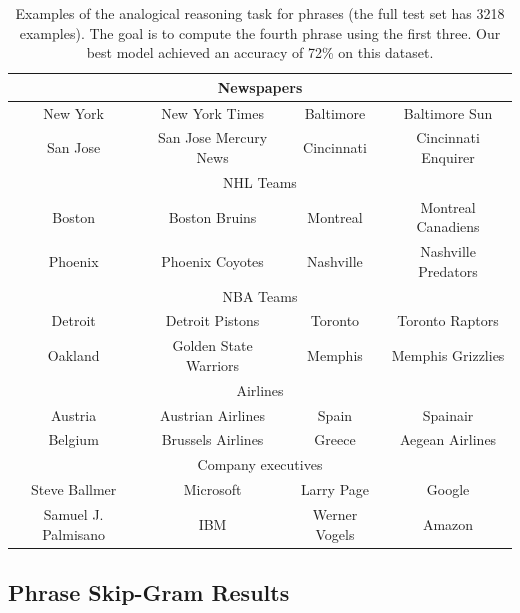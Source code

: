 \documentclass{article}
\begin{document}
\begin{table}
\small
\begin{center}
\begin{tabular}{|c c||c c|}
\hline
\multicolumn{4}{|c|}{Newspapers}\\
\hline
New York & New York Times & Baltimore & Baltimore Sun \\
San Jose & San Jose Mercury News & Cincinnati & Cincinnati Enquirer \\
\hline
\multicolumn{4}{|c|}{NHL Teams}\\
\hline
Boston & Boston Bruins & Montreal & Montreal Canadiens \\
Phoenix & Phoenix Coyotes & Nashville & Nashville Predators \\
\hline
\multicolumn{4}{|c|}{NBA Teams}\\
\hline
Detroit & Detroit Pistons & Toronto & Toronto Raptors \\
Oakland & Golden State Warriors & Memphis & Memphis Grizzlies \\
\hline
\multicolumn{4}{|c|}{Airlines}\\
\hline
Austria & Austrian Airlines & Spain & Spainair \\
Belgium & Brussels Airlines & Greece & Aegean Airlines \\
\hline
\multicolumn{4}{|c|}{Company executives}\\
\hline
Steve Ballmer & Microsoft & Larry Page & Google \\
Samuel J. Palmisano & IBM & Werner Vogels & Amazon \\
\hline
\end{tabular}
\end{center}
\caption{
\label{table:phrase_example} Examples of the
analogical reasoning task for phrases (the full test set has 3218 examples).
The goal is to compute the fourth phrase using the first three. Our best model achieved an accuracy of 72\% on this dataset.}
\end{table}

\subsection{Phrase Skip-Gram Results}
\label{sec:phrase_results}
\end{document}
